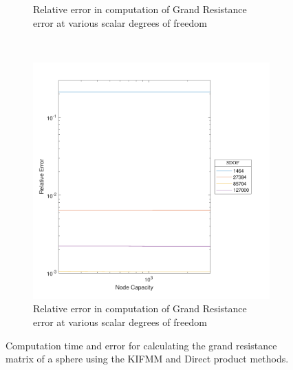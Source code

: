 \begin{figure}[ht]
\begin{subfigure}[b]{0.49\textwidth}
         \caption{Relative error in computation of Grand Resistance error at various scalar degrees of freedom}
         \label{fig:NodeCapError}
     \end{subfigure} \\
     \begin{subfigure}[b]{0.49\textwidth}
         \centering
         \includegraphics[width=\textwidth]{Images/KIFMM/Graphs/NodeCapError2.pdf}
         \caption{Relative error in computation of Grand Resistance error at various scalar degrees of freedom}
         \label{fig:NodeCapTime2}
     \end{subfigure}
        \caption{Computation time and error for calculating the grand resistance matrix of a sphere using the KIFMM and Direct product methods.}
        \label{fig:NodeCap}
\end{figure}
